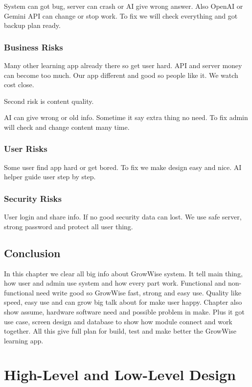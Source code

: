 \documentclass{FastFyp}
\begin{document}
System can got bug, server can crash or AI give wrong answer. Also OpenAI or Gemini API can change or stop work. To fix we will check everything and got backup plan ready.

\subsection{Business Risks}

Many other learning app already there so get user hard. API and server money can become too much. Our app different and good so people like it. We watch cost close.

Second risk is content quality.

AI can give wrong or old info. Sometime it say extra thing no need. To fix admin will check and change content many time.

\subsection{User Risks}

Some user find app hard or get bored. To fix we make design easy and nice. AI helper guide user step by step.

\subsection{Security Risks}

User login and share info. If no good security data can lost. We use safe server, strong password and protect all user thing.

\section*{Conclusion}

In this chapter we clear all big info about GrowWise system. It tell main thing, how user and admin use system and how every part work. Functional and non-functional need write good so GrowWise fast, strong and easy use. Quality like speed, easy use and can grow big talk about for make user happy. Chapter also show assume, hardware software need and possible problem in make. Plus it got use case, screen design and database to show how module connect and work together. All this give full plan for build, test and make better the GrowWise learning app.

\chapter{High-Level and Low-Level Design}
\end{document}
